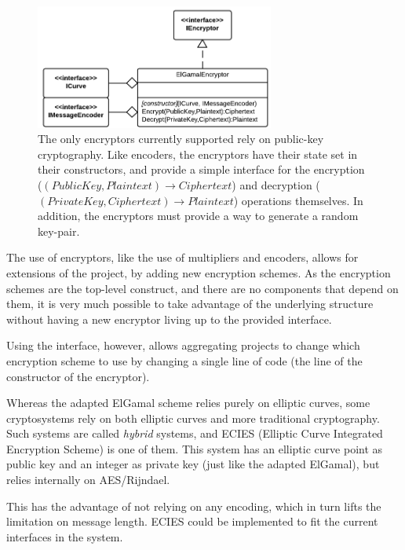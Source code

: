 \begin{figure}[htb]
	\centering
	\includegraphics[width=0.7\textwidth]{implementation/encryptors}
	\caption{The only encryptors currently supported rely on public-key cryptography. Like encoders, the encryptors have their state set
		in their constructors, and provide a simple interface for the encryption (\((PublicKey,Plaintext) \to Ciphertext\)) and decryption
		(\((PrivateKey,Ciphertext) \to Plaintext\)) operations themselves. In addition, the encryptors must provide a way to generate a
		random key-pair.}
\end{figure}

The use of encryptors, like the use of multipliers and encoders, allows for extensions of the project, by adding new encryption schemes.
As the encryption schemes are the top-level construct, and there are no components that depend on them, it is very much possible to take
advantage of the underlying structure without having a new encryptor living up to the provided interface.

Using the interface, however, allows aggregating projects to change which encryption scheme to use by changing a single line of code (the
line of the constructor of the encryptor).

Whereas the adapted ElGamal scheme relies purely on elliptic curves, some cryptosystems rely on both elliptic curves and more traditional
cryptography. Such systems are called \emph{hybrid} systems, and ECIES (Elliptic Curve Integrated Encryption Scheme) is one of them. This
system has an elliptic curve point as public key and an integer as private key (just like the adapted ElGamal), but relies internally on
AES/Rijndael.\cite{hankerson2010}

This has the advantage of not relying on any encoding, which in turn lifts the limitation on message length. ECIES could be implemented to
fit the current interfaces in the system.